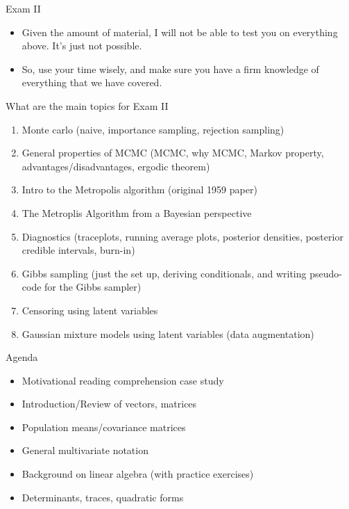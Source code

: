 \documentclass[
  ignorenonframetext,
]{beamer}
\providecommand{\tightlist}{%
  \setlength{\itemsep}{0pt}\setlength{\parskip}{0pt}}
\begin{document}
\begin{frame}{Exam II}
\protect\hypertarget{exam-ii-1}{}

\begin{itemize}
\tightlist
\item
  Given the amount of material, I will not be able to test you on
  everything above. It's just not possible.
\item
  So, use your time wisely, and make sure you have a firm knowledge of
  everything that we have covered.
\end{itemize}

\end{frame}

\begin{frame}{What are the main topics for Exam II}
\protect\hypertarget{what-are-the-main-topics-for-exam-ii}{}

\begin{enumerate}
\tightlist
\item
  Monte carlo (naive, importance sampling, rejection sampling)
\item
  General properties of MCMC (MCMC, why MCMC, Markov property,
  advantages/disadvantages, ergodic theorem)
\item
  Intro to the Metropolis algorithm (original 1959 paper)
\item
  The Metroplis Algorithm from a Bayesian perspective
\item
  Diagnostics (traceplots, running average plots, posterior densities,
  posterior credible intervals, burn-in)
\item
  Gibbs sampling (just the set up, deriving conditionals, and writing
  pseudo-code for the Gibbs sampler)
\item
  Censoring using latent variables
\item
  Gaussian mixture models using latent variables (data augmentation)
\end{enumerate}

\end{frame}

\begin{frame}{Agenda}
\protect\hypertarget{agenda}{}

\begin{itemize}
\tightlist
\item
  Motivational reading comprehension case study
\item
  Introduction/Review of vectors, matrices
\item
  Population means/covariance matrices
\item
  General multivariate notation
\item
  Background on linear algebra (with practice exercises)
\item
  Determinants, traces, quadratic forms
\end{itemize}

\end{frame}
\end{document}

